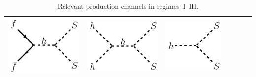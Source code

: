 \begin{table}[t!]
\begin{tabular}{|c|cccccc|}
  \includegraphics[scale=0.32]{figures/feynman_diagrams/ffssfeynman.pdf} &
  \includegraphics[scale=0.32]{figures/feynman_diagrams/hhssfeynman_s-channel.pdf} & 
  \includegraphics[scale=0.32]{figures/feynman_diagrams/hssfeynman.pdf} \\
  \hline
 \end{tabular}
  \caption{\label{tab:RegimesFeynman}Relevant production channels in regimes~I--III.}
\end{table}


